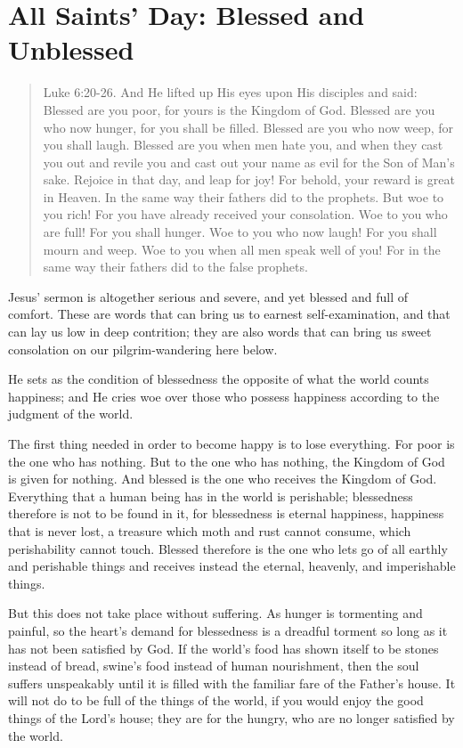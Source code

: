 
\section{All Saints’ Day: Blessed and Unblessed}

\begin{quote}

Luke 6:20-26. And He lifted up His eyes upon His disciples and said: Blessed are you poor, for yours is the Kingdom of God. Blessed are you who now hunger, for you shall be filled. Blessed are you who now weep, for you shall laugh. Blessed are you when men hate you, and when they cast you out and revile you and cast out your name as evil for the Son of Man’s sake. Rejoice in that day, and leap for joy! For behold, your reward is great in Heaven. In the same way their fathers did to the prophets. But woe to you rich! For you have already received your consolation. Woe to you who are full! For you shall hunger. Woe to you who now laugh! For you shall mourn and weep. Woe to you when all men speak well of you! For in the same way their fathers did to the false prophets.

\end{quote}

\bigskip

Jesus’ sermon is altogether serious and severe, and yet blessed and full of comfort. These are words that can bring us to earnest self-examination, and that can lay us low in deep contrition; they are also words that can bring us sweet consolation on our pilgrim-wandering here below.

He sets as the condition of blessedness the opposite of what the world counts happiness; and He cries woe over those who possess happiness according to the judgment of the world.

The first thing needed in order to become happy is to lose everything. For poor is the one who has nothing. But to the one who has nothing, the Kingdom of God is given for nothing. And blessed is the one who receives the Kingdom of God. Everything that a human being has in the world is perishable; blessedness therefore is not to be found in it, for blessedness is eternal happiness, happiness that is never lost, a treasure which moth and rust cannot consume, which perishability cannot touch. Blessed therefore is the one who lets go of all earthly and perishable things and receives instead the eternal, heavenly, and imperishable things.

But this does not take place without suffering. As hunger is tormenting and painful, so the heart’s demand for blessedness is a dreadful torment so long as it has not been satisfied by God. If the world’s food has shown itself to be stones instead of bread, swine’s food instead of human nourishment, then the soul suffers unspeakably until it is filled with the familiar fare of the Father’s house. It will not do to be full of the things of the world, if you would enjoy the good things of the Lord’s house; they are for the hungry, who are no longer satisfied by the world.

